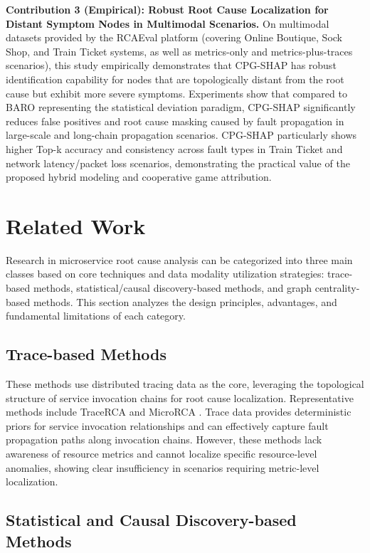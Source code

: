 \documentclass[conference]{IEEEtran}
\begin{document}
\textbf{Contribution 3 (Empirical): Robust Root Cause Localization for Distant Symptom Nodes in Multimodal Scenarios.} On multimodal datasets provided by the RCAEval platform (covering Online Boutique, Sock Shop, and Train Ticket systems, as well as metrics-only and metrics-plus-traces scenarios), this study empirically demonstrates that CPG-SHAP has robust identification capability for nodes that are topologically distant from the root cause but exhibit more severe symptoms. Experiments show that compared to BARO representing the statistical deviation paradigm, CPG-SHAP significantly reduces false positives and root cause masking caused by fault propagation in large-scale and long-chain propagation scenarios. CPG-SHAP particularly shows higher Top-k accuracy and consistency across fault types in Train Ticket and network latency/packet loss scenarios, demonstrating the practical value of the proposed hybrid modeling and cooperative game attribution.

\section{Related Work}

Research in microservice root cause analysis can be categorized into three main classes based on core techniques and data modality utilization strategies: trace-based methods, statistical/causal discovery-based methods, and graph centrality-based methods. This section analyzes the design principles, advantages, and fundamental limitations of each category.

\subsection{Trace-based Methods}

These methods use distributed tracing data as the core, leveraging the topological structure of service invocation chains for root cause localization. Representative methods include TraceRCA \cite{tracerca} and MicroRCA \cite{microrca}. Trace data provides deterministic priors for service invocation relationships and can effectively capture fault propagation paths along invocation chains. However, these methods lack awareness of resource metrics and cannot localize specific resource-level anomalies, showing clear insufficiency in scenarios requiring metric-level localization.

\subsection{Statistical and Causal Discovery-based Methods}
\end{document}
